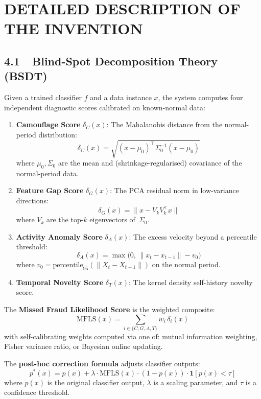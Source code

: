 \documentclass[12pt,a4paper]{article}
\begin{document}
\section{DETAILED DESCRIPTION OF THE INVENTION}

\subsection{4.1~~Blind-Spot Decomposition Theory (BSDT)}

Given a trained classifier $f$ and a data instance $x$, the system computes
four independent diagnostic scores calibrated on known-normal data:

\begin{enumerate}
\item \textbf{Camouflage Score} $\delta_C(x)$: The Mahalanobis distance from
  the normal-period distribution:
  \[
    \delta_C(x) = \sqrt{(x - \mu_0)^\top \Sigma_0^{-1} (x - \mu_0)}
  \]
  where $\mu_0, \Sigma_0$ are the mean and (shrinkage-regularised) covariance
  of the normal-period data.

\item \textbf{Feature Gap Score} $\delta_G(x)$: The PCA residual norm in
  low-variance directions:
  \[
    \delta_G(x) = \|x - V_k V_k^\top x\|
  \]
  where $V_k$ are the top-$k$ eigenvectors of~$\Sigma_0$.

\item \textbf{Activity Anomaly Score} $\delta_A(x)$: The excess velocity
  beyond a percentile threshold:
  \[
    \delta_A(x) = \max\bigl(0, \, \|x_t - x_{t-1}\| - v_0\bigr)
  \]
  where $v_0 = \mathrm{percentile}_{95}(\|X_t - X_{t-1}\|)$ on the normal
  period.

\item \textbf{Temporal Novelty Score} $\delta_T(x)$: The kernel density
  self-history novelty score.
\end{enumerate}

The \textbf{Missed Fraud Likelihood Score} is the weighted composite:
\[
  \mathrm{MFLS}(x) = \sum_{i \in \{C,G,A,T\}} w_i \, \delta_i(x)
\]
with self-calibrating weights computed via one of: mutual information
weighting, Fisher variance ratio, or Bayesian online updating.

The \textbf{post-hoc correction formula} adjusts classifier outputs:
\[
  p^*(x) = p(x) + \lambda \cdot \mathrm{MFLS}(x) \cdot (1 - p(x))
  \cdot \mathbf{1}[p(x) < \tau]
\]
where $p(x)$ is the original classifier output, $\lambda$ is a scaling
parameter, and $\tau$ is a confidence threshold.
\end{document}

